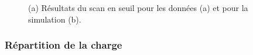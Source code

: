 \begin{figure}[!ht]
  \caption{(a) Résultats du scan en seuil pour les données (a) et pour la simulation (b). \label{fig.thrScan}}
\end{figure}


\subsubsection{Répartition de la charge}

